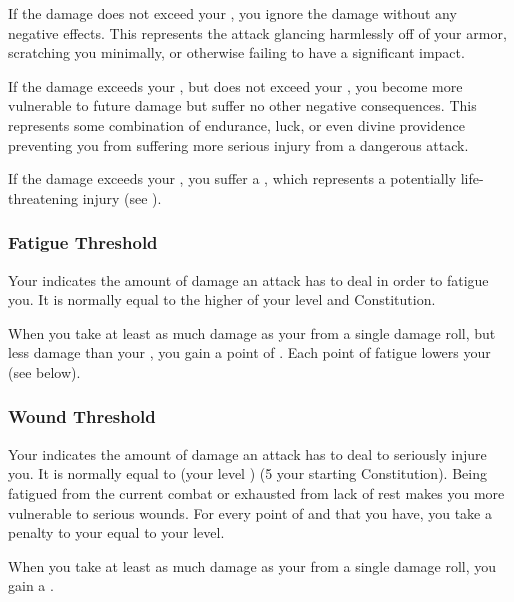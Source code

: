         If the damage does not exceed your , you ignore the damage without any negative effects.
        This represents the attack glancing harmlessly off of your armor, scratching you minimally, or otherwise failing to have a significant impact.

        If the damage exceeds your , but does not exceed your , you become more vulnerable to future damage but suffer no other negative consequences.
        This represents some combination of endurance, luck, or even divine providence preventing you from suffering more serious injury from a dangerous attack.

        If the damage exceeds your , you suffer a , which represents a potentially life-threatening injury (see ).

        \subsubsection{Fatigue Threshold}\label{Fatigue Threshold}
            Your  indicates the amount of damage an attack has to deal in order to fatigue you.
            It is normally equal to the higher of your level and Constitution.

            When you take at least as much damage as your  from a single damage roll, but less damage than your , you gain a point of .
            Each point of fatigue lowers your  (see below).

        \subsubsection{Wound Threshold}\label{Wound Threshold}
            Your  indicates the amount of damage an attack has to deal to seriously injure you.
            It is normally equal to (your level ) \mtimes (5 \add your starting Constitution).
            Being fatigued from the current combat or exhausted from lack of rest makes you more vulnerable to serious wounds.
            For every point of  and  that you have, you take a penalty to your  equal to your level.

            When you take at least as much damage as your  from a single damage roll, you gain a .

